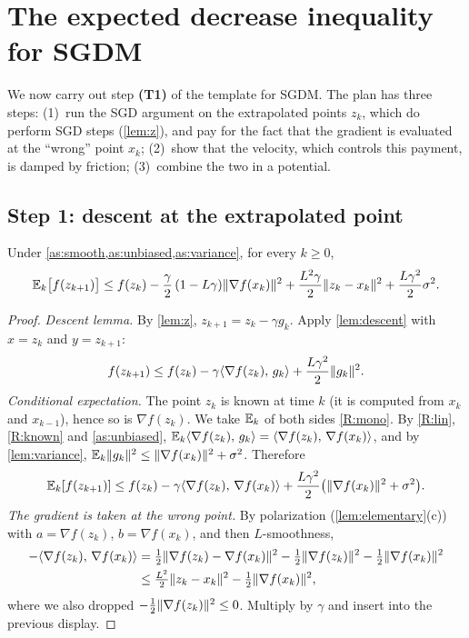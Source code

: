 \section{The expected decrease inequality for SGDM}\label{sec:master}

We now carry out step \textbf{(T1)} of the template for SGDM. The plan has three steps:
(1)~run the SGD argument on the extrapolated points $z_k$, which do perform SGD steps
(\cref{lem:z}), and pay for the fact that the gradient is evaluated at the ``wrong'' point
$x_k$; (2)~show that the velocity, which controls this payment, is damped by friction;
(3)~combine the two in a potential.

\subsection{Step 1: descent at the extrapolated point}

\begin{lemma}\label{lem:z-descent}
Under \cref{as:smooth,as:unbiased,as:variance}, for every $k\ge0$,
\begin{equation}\label{eq:z-descent}
  \mathbb{E}_k\bigl[f(z_{k+1})\bigr]\le f(z_k)-\frac\gamma2\,(1-L\gamma)\lVert \nabla f(x_k)\rVert^2
  +\frac{L^2\gamma}{2}\lVert z_k-x_k\rVert^2+\frac{L\gamma^2}{2}\sigma^2 .
\end{equation}
\end{lemma}

\begin{proof}
\emph{Descent lemma.} By \cref{lem:z}, $z_{k+1}=z_k-\gamma g_k$. Apply
\cref{lem:descent} with $x=z_k$ and $y=z_{k+1}$:
\[
  f(z_{k+1})\le f(z_k)-\gamma\langle \nabla f(z_k),\, g_k\rangle+\frac{L\gamma^2}{2}\lVert g_k\rVert^2 .
\]
\emph{Conditional expectation.} The point $z_k$ is known at time $k$ (it is computed from
$x_k$ and $x_{k-1}$), hence so is $\nabla f(z_k)$. We take $\mathbb{E}_k$ of both sides \ref{R:mono}. By \ref{R:lin},
\ref{R:known} and \cref{as:unbiased}, $\mathbb{E}_k\langle \nabla f(z_k),\, g_k\rangle=\langle \nabla f(z_k),\, \nabla f(x_k)\rangle$, and by
\cref{lem:variance}, $\mathbb{E}_k\lVert g_k\rVert^2\le\lVert \nabla f(x_k)\rVert^2+\sigma^2$. Therefore
\[
  \mathbb{E}_k[f(z_{k+1})]\le f(z_k)-\gamma\langle \nabla f(z_k),\, \nabla f(x_k)\rangle
  +\frac{L\gamma^2}{2}\bigl(\lVert \nabla f(x_k)\rVert^2+\sigma^2\bigr).
\]
\emph{The gradient is taken at the wrong point.} By polarization
(\cref{lem:elementary}(c)) with $a=\nabla f(z_k)$, $b=\nabla f(x_k)$, and then
$L$-smoothness,
\begin{align*}
  -\langle \nabla f(z_k),\, \nabla f(x_k)\rangle
  &=\tfrac12\lVert \nabla f(z_k)-\nabla f(x_k)\rVert^2-\tfrac12\lVert \nabla f(z_k)\rVert^2-\tfrac12\lVert \nabla f(x_k)\rVert^2\\
  &\le\tfrac{L^2}{2}\lVert z_k-x_k\rVert^2-\tfrac12\lVert \nabla f(x_k)\rVert^2,
\end{align*}
where we also dropped $-\frac12\lVert \nabla f(z_k)\rVert^2\le0$. Multiply by $\gamma$ and
insert into the previous display.
\end{proof}

